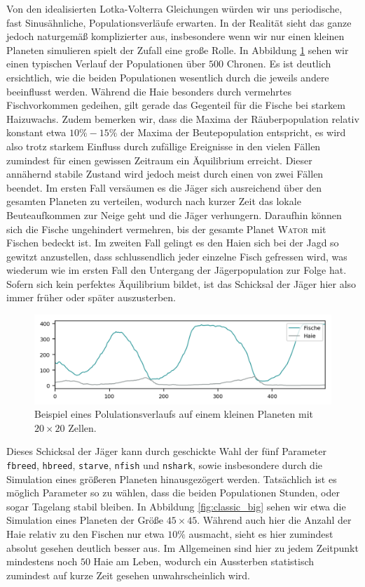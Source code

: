 \documentclass[a4paper,11pt]{article}
\newcommand{\wator}{\textsc{Wator }}
\theoremstyle{definition}
\numberwithin{equation}{section}
\begin{document}
	Von den idealisierten Lotka-Volterra Gleichungen würden wir uns periodische, fast Sinusähnliche, Populationsverläufe erwarten. In der Realität sieht das ganze jedoch naturgemäß komplizierter aus, insbesondere wenn wir nur einen kleinen Planeten simulieren spielt der Zufall eine große Rolle. In Abbildung \ref{fig:classic_default} sehen wir einen typischen Verlauf der Populationen über $500$ Chronen. Es ist deutlich ersichtlich, wie die beiden Populationen wesentlich durch die jeweils andere beeinflusst werden. Während die Haie besonders durch vermehrtes Fischvorkommen gedeihen, gilt gerade das Gegenteil für die Fische bei starkem Haizuwachs. Zudem bemerken wir, dass die Maxima der Räuberpopulation relativ konstant etwa $10\%-15\%$ der Maxima der Beutepopulation entspricht, es wird also trotz starkem Einfluss durch zufällige Ereignisse in den vielen Fällen zumindest für einen gewissen Zeitraum ein Äquilibrium erreicht. Dieser annähernd stabile Zustand wird jedoch meist durch einen von zwei Fällen beendet. Im ersten Fall versäumen es die Jäger sich ausreichend über den gesamten Planeten zu verteilen, wodurch nach kurzer Zeit das lokale Beuteaufkommen zur Neige geht und die Jäger verhungern. Daraufhin können sich die Fische ungehindert vermehren, bis der gesamte Planet \wator mit Fischen bedeckt ist. Im zweiten Fall gelingt es den Haien sich bei der Jagd so gewitzt anzustellen, dass schlussendlich jeder einzelne Fisch gefressen wird, was wiederum wie im ersten Fall den Untergang der Jägerpopulation zur Folge hat. Sofern sich kein perfektes Äquilibrium bildet, ist das Schicksal der Jäger hier also immer früher oder später auszusterben. \newline

	\begin{figure}
		\centering
		\includegraphics[width=\textwidth]{pictures/classic_default.png}
		\caption{Beispiel eines Polulationsverlaufs auf einem kleinen Planeten mit $20 \times 20$ Zellen.}
		\label{fig:classic_default}
	\end{figure}

	Dieses Schicksal der Jäger kann durch geschickte Wahl der fünf Parameter \texttt{fbreed}, \texttt{hbreed}, \texttt{starve}, \texttt{nfish} und \texttt{nshark}, sowie insbesondere durch die Simulation eines größeren Planeten hinausgezögert werden. Tatsächlich ist es möglich Parameter so zu wählen, dass die beiden Populationen Stunden, oder sogar Tagelang stabil bleiben. In Abbildung \ref{fig:classic_big} sehen wir etwa die Simulation eines Planeten der Größe $45 \times 45$. Während auch hier die Anzahl der Haie relativ zu den Fischen nur etwa $10\%$ ausmacht, sieht es hier zumindest absolut gesehen deutlich besser aus. Im Allgemeinen sind hier zu jedem Zeitpunkt mindestens noch $50$ Haie am Leben, wodurch ein Aussterben statistisch zumindest auf kurze Zeit gesehen unwahrscheinlich wird.
\end{document}

